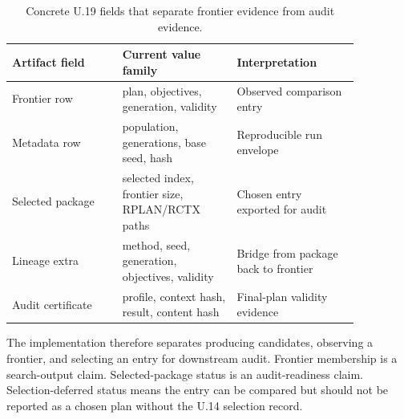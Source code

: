 \begin{table}[htbp]
\centering
\small
\begin{tabular}{p{0.27\linewidth}p{0.29\linewidth}p{0.30\linewidth}}
\toprule
Artifact field & Current value family & Interpretation \\
\midrule
Frontier row & plan, objectives, generation, validity & Observed comparison entry \\
Metadata row & population, generations, base seed, hash & Reproducible run envelope \\
Selected package & selected index, frontier size, RPLAN/RCTX paths & Chosen entry exported for audit \\
Lineage extra & method, seed, generation, objectives, validity & Bridge from package back to frontier \\
Audit certificate & profile, context hash, result, content hash & Final-plan validity evidence \\
\bottomrule
\end{tabular}
\caption{Concrete U.19 fields that separate frontier evidence from audit evidence.}
\end{table}

The implementation therefore separates producing candidates, observing a
frontier, and selecting an entry for downstream audit. Frontier membership is a
search-output claim. Selected-package status is an audit-readiness claim.
Selection-deferred status means the entry can be compared but should not be
reported as a chosen plan without the U.14 selection record.
